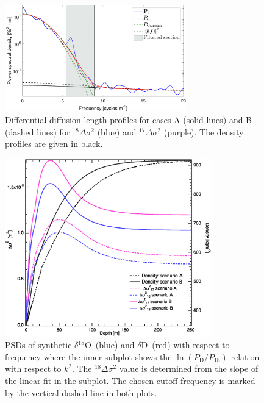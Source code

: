 \documentclass[11pt, draftcls, onecolumn]{IEEEtran} %
\numberwithin{equation}{section}
\numberwithin{table}{section}
\numberwithin{figure}{section}
\newcommand{\delOx}{$\delta{}^{18}\mathrm{O}$}
\newcommand{\delD}{$\delta\mathrm{D}$}
\begin{document}
\begin{figure}[]	
\vspace*{2mm}	
\begin{center}		
	\includegraphics[width=0.7\textwidth]{Figure_6}		
	\caption{Differential diffusion length profiles for cases A (solid lines) and B 
		(dashed lines) for ${}^{18}\Delta\sigma^2$  (blue) and ${}^{17}\Delta\sigma^2$ (purple).
		The density profiles are given in black.} 		
	\label{fig:diff_diffusion_example}	
\end{center}
\end{figure}



\begin{figure}[]	
\vspace*{2mm}	
\begin{center}		
	\includegraphics[width=0.8\textwidth]{Figure_7}		
	\caption{PSDs of synthetic \delOx~(blue) and \delD~(red) with respect to frequency where
		the inner subplot shows the $\ln \left({P_\mathrm{D}}/{P_{18}}\right)$ relation with respect to  $k^2$. 
		The ${}^{18}\Delta\sigma^2$ value is determined from the slope of the linear fit in the subplot.
		The chosen cutoff frequency is marked by the vertical dashed line in both plots.} 		
	\label{fig:spectral_diff_diffusion_example}	
\end{center}
\end{figure}
\end{document}
